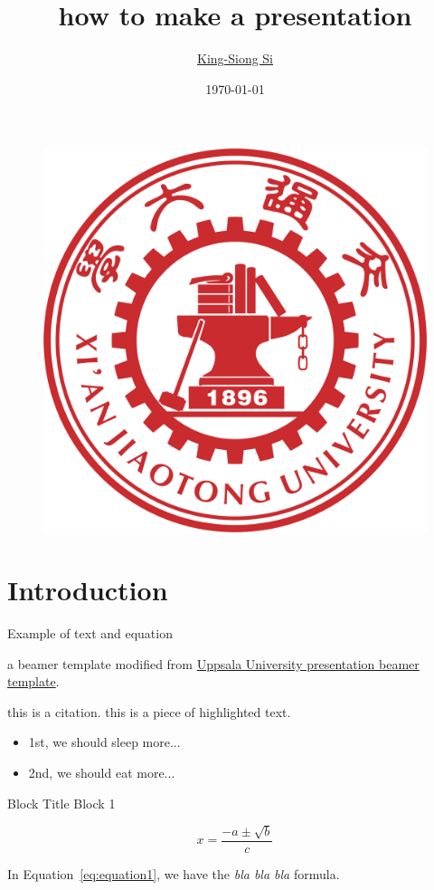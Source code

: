 \documentclass{beamer}
\author[K. Si, \contact]{\href{}{King-Siong Si}}
\institute[IMKFE, XJTU]{\href{}{Institute of Multimedia Knowledge Fusion and Engineering,\\ Xi'an Jiaotong University}
    \\ \smallskip \contact}
\title[beamer]{how to make a presentation}
\date{\today}
\newcommand{\hl}[1]{\textcolor{uppsalared}{#1}} %
\begin{document}
{

\begin{frame}\label{start}
    \titlepage
    \begin{figure}
            \includegraphics[width=.2\textwidth]{style/xjtu_logo.png} 
    \end{figure}
\end{frame}
}

\begin{frame}
    \tableofcontents[sectionstyle=show, subsectionstyle=show/shaded/hide, subsubsectionstyle=show/shaded/hide]
\end{frame}


\section{Introduction}

\begin{frame}{Example of text and equation}

    a beamer template modified from \href{https://www.overleaf.com/latex/templates/uppsala-university-beamer-template-v2-dot-0/sjbwbmzvpbbf}{Uppsala University presentation beamer template}. 

    this is a citation.\cite{vaswani2017attention}
    this is a piece of \hl{highlighted text}.

    \begin{itemize}[<+->] %
        \item 1st, we should sleep more...
        \item 2nd, we should eat more...
    \end{itemize}

    \begin{block}{Block Title}
        Block 1
    \end{block}

    \centering
    \begin{equation}
        x = \frac{{-a \pm \sqrt{{b}}}}{{c}}
        \label{eq:equation1}
    \end{equation}

    In Equation~\ref{eq:equation1}, we have the \textit{bla bla bla} formula.

\end{frame}
\end{document}
